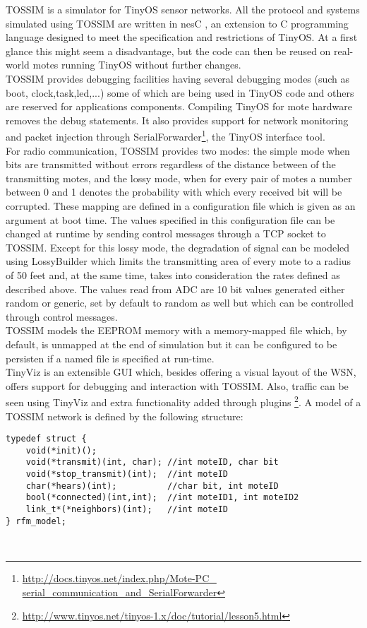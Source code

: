 \label{subsec:tossim}
TOSSIM\cite{tossim} is a simulator for TinyOS sensor networks.
All the protocol and systems simulated using TOSSIM are written in nesC \cite{nesC},
an extension to C programming language designed to meet the specification and 
restrictions of TinyOS. At a first glance this might seem a disadvantage, but 
the code can then be reused on real-world motes running TinyOS
without further changes.
\\
TOSSIM provides debugging facilities having several debugging modes 
(such as boot, clock,task,led,...) some of which are being used in TinyOS code
and others are reserved for applications components. Compiling TinyOS for mote
hardware removes the debug statements.
It also provides support for network monitoring and packet injection
through SerialForwarder\footnote{\url{http://docs.tinyos.net/index.php/Mote-PC_
serial_communication_and_SerialForwarder}}, the TinyOS interface tool.
\\
For radio communication, TOSSIM provides two modes: the simple mode when bits
are transmitted without errors regardless of the distance between of the transmitting
motes, and the lossy mode, when for every pair of motes a number between 0 and 1 
denotes the probability with which every received bit will be corrupted. These 
mapping are defined in a configuration file which is given as an argument at boot
time. The values specified in this configuration file can be changed at runtime
by sending control messages through a TCP socket to TOSSIM.
 Except for this lossy mode, the degradation of signal can be modeled using
LossyBuilder which limits the transmitting area of every mote to a radius of 50
 feet and, at the same time, takes into consideration the rates defined as 
described above.
The values read from ADC are 10 bit values generated either random or generic, set
by default to random as well but which can be controlled through control messages.
\\
TOSSIM models the EEPROM memory with a memory-mapped file which, by default, is
unmapped at the end of simulation but it can be configured to be persisten if a
named file is specified at run-time.
\\
TinyViz is an extensible GUI which, besides offering a visual layout of the 
WSN, offers support for debugging and interaction with TOSSIM. Also, traffic can
be seen using TinyViz and extra functionality added through plugins
\footnote{\url{http://www.tinyos.net/tinyos-1.x/doc/tutorial/lesson5.html}}.
A model of a TOSSIM network is defined by the following structure:
\begin{lstlisting}
typedef struct {
    void(*init)();
    void(*transmit)(int, char); //int moteID, char bit
    void(*stop_transmit)(int);  //int moteID
    char(*hears)(int);          //char bit, int moteID
    bool(*connected)(int,int);  //int moteID1, int moteID2
    link_t*(*neighbors)(int);   //int moteID
} rfm_model;
\end{lstlisting}
\\
